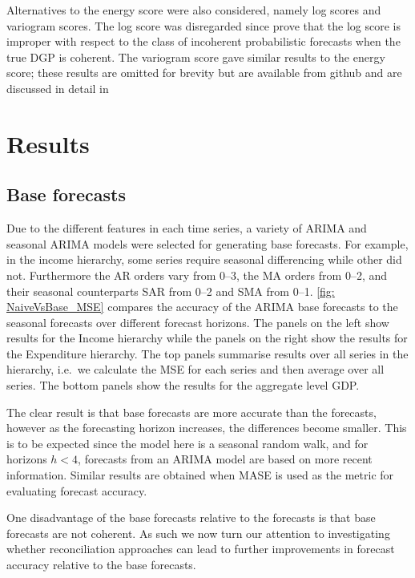 {Alternatives to the energy score were also considered, namely log scores and variogram scores. The log score was disregarded since \citet{GamEtAl2018} prove that the log score is improper with respect to the class of incoherent probabilistic forecasts when the true DGP is coherent. The variogram score gave similar results to the energy score;  these results are omitted for brevity but are available from github and are discussed in detail in \cite{gamakumara2019phd}


\section{Results}\label{sec:results}

\subsection{Base forecasts}

Due to the different features in each time series, a variety of ARIMA and seasonal ARIMA models were selected for generating base forecasts. For example, in the income hierarchy, some series require seasonal differencing while other did not. Furthermore the AR orders vary from 0--3, the MA orders from 0--2, and their seasonal counterparts SAR from 0--2 and SMA from 0--1. \ref{fig: NaiveVsBase_MSE} compares the accuracy of the ARIMA base forecasts to the seasonal \naive forecasts over different forecast horizons. The panels on the left show results for the Income hierarchy while the panels on the right show the results for the Expenditure hierarchy. The top panels summarise results over all series in the hierarchy, i.e.\ we calculate the MSE for each series and then average over all series. The bottom panels show the results for the aggregate level GDP.

The clear result is that base forecasts are more accurate than the \naive forecasts, however as the forecasting horizon increases, the differences become smaller. This is to be expected since the \naive model here is a seasonal random walk, and for horizons $h<4$, forecasts from an ARIMA model are based on more recent information. Similar results are obtained when MASE is used as the metric for evaluating forecast accuracy.

One disadvantage of the base forecasts relative to the \naive forecasts is that base forecasts are not coherent. As such we now turn our attention to investigating whether reconciliation approaches can lead to further improvements in forecast accuracy relative to the base forecasts.

}
